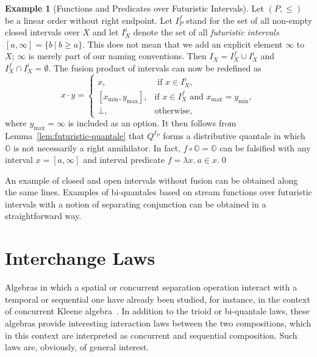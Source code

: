 \documentclass[12pt]{article}
\theoremstyle{definition}
\newtheorem{example}{Example}
\newcommand{\zero}{\mathbb{O}}
\begin{document}
\begin{example}[Functions and Predicates over Futuristic Intervals]
  Let $(P,\le)$ be a linear order without right endpoint. Let $I_P^f$
  stand for the set of all non-empty closed intervals over $X$ and let
  $I_X^i$ denote the set of all \emph{futuristic intervals}
  $[a,\infty]= \{ b\ |\ b\ge a\}$. This does not mean that we add an
  explicit element $\infty$ to $X$; $\infty$ is merely part of our
  naming conventions. Then $I_X=I_X^f\cup I_X^i$ and $I_X^f\cap
  I_X^i=\emptyset$. The fusion product of intervals can now be
  redefined as
\begin{equation*}
  x\cdot y =
  \begin{cases}
    x, &\text{ if } x\in I_X^i,\\
    [x_{\min},y_{\max}], &\text{if } x\in I_X^f \text{ and } x_{\max}=y_{\min},\\
\bot, &\text{otherwise},
  \end{cases}
\end{equation*}
where $y_{\max}=\infty$ is included as an option.  It then follows
from Lemma~\ref{lem:futuristic-quantale} that $Q^{I_P}$ forms a
distributive quantale in which $\zero$ is not necessarily a right
annihilator. In fact, $f\circ \zero = \zero$ can be falsified with any
interval $x=[a,\infty]$ and interval predicate $f=\lambda x.\ a\in
x$.\qed
\end{example}
An example of closed and open intervals without fusion can be obtained
along the same lines. Examples of bi-quantales based on stream
functions over futuristic intervals with a notion of separating
conjunction can be obtained in a straightforward way.



\section{Interchange Laws}\label{sec:interchange}

Algebras in which a spatial or concurrent separation operation
interact with a temporal or sequential one have already been studied,
for instance, in the context of concurrent Kleene
algebra~\cite{HMSW11}. In addition to the trioid or bi-quantale laws,
these algebras provide interesting interaction laws between the two
compositions, which in this context are interpreted as concurrent and
sequential composition.  Such laws are, obviously, of
general interest.
\end{document}
